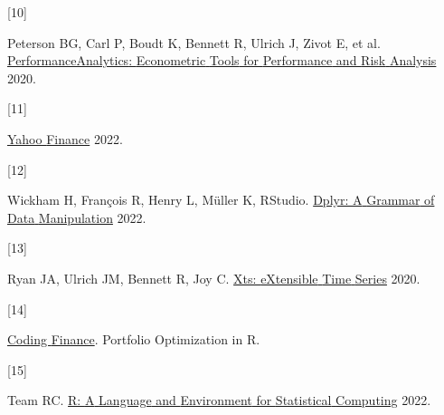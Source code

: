 \documentclass[
]{article}
\newlength{\cslhangindent}
\newlength{\csllabelwidth}
\newlength{\cslentryspacingunit} %
\newenvironment{CSLReferences}[2] %
 {%
  \setlength{\parindent}{0pt}
  \ifodd #1
  \let\oldpar\par
  \def\par{\hangindent=\cslhangindent\oldpar}
  \fi
  \setlength{\parskip}{#2\cslentryspacingunit}
 }%
 {}
\newcommand{\CSLLeftMargin}[1]{\parbox[t]{\csllabelwidth}{#1}}
\newcommand{\CSLRightInline}[1]{\parbox[t]{\linewidth - \csllabelwidth}{#1}\break}
\begin{document}
\begin{CSLReferences}{0}{0}
\leavevmode{}%
\CSLLeftMargin{{[}10{]} }%
\CSLRightInline{Peterson BG, Carl P, Boudt K, Bennett R, Ulrich J, Zivot
E, et al.
\href{https://CRAN.R-project.org/package=PerformanceAnalytics}{{PerformanceAnalytics}:
{Econometric} {Tools} for {Performance} and {Risk} {Analysis}} 2020.}

\leavevmode{}%
\CSLLeftMargin{{[}11{]} }%
\CSLRightInline{\href{https://finance.yahoo.com/}{Yahoo {Finance}}
2022.}

\leavevmode{}%
\CSLLeftMargin{{[}12{]} }%
\CSLRightInline{Wickham H, François R, Henry L, Müller K, RStudio.
\href{https://CRAN.R-project.org/package=dplyr}{Dplyr: {A} {Grammar} of
{Data} {Manipulation}} 2022.}

\leavevmode{}%
\CSLLeftMargin{{[}13{]} }%
\CSLRightInline{Ryan JA, Ulrich JM, Bennett R, Joy C.
\href{https://CRAN.R-project.org/package=xts}{Xts: {eXtensible} {Time}
{Series}} 2020.}

\leavevmode{}%
\CSLLeftMargin{{[}14{]} }%
\CSLRightInline{\href{https://www.codingfinance.com/post/2018-05-31-portfolio-opt-in-r/}{Coding
{Finance}}. Portfolio Optimization in R.}

\leavevmode{}%
\CSLLeftMargin{{[}15{]} }%
\CSLRightInline{Team RC. \href{https://www.r-project.org/}{R: {A}
{Language} and {Environment} for {Statistical} {Computing}} 2022.}

\end{CSLReferences}
\end{document}

